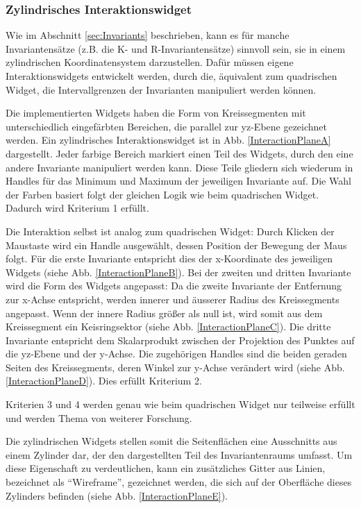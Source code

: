 \documentclass[a4paper,fontsize=12pt,toc=bib,halfparskip]{scrartcl}
\begin{document}
\subsubsection{Zylindrisches Interaktionswidget}
Wie im Abschnitt \ref{sec:Invariants} beschrieben, kann es f\"ur manche Invariantens\"atze (z.B. die K- und R-Invariantens\"atze) sinnvoll sein, sie in einem zylindrischen Koordinatensystem darzustellen. Daf\"ur m\"ussen eigene Interaktionswidgets entwickelt werden, durch die, \"aquivalent zum quadrischen Widget, die Intervallgrenzen der Invarianten manipuliert werden k\"onnen.

Die implementierten Widgets haben die Form von Kreissegmenten mit unterschiedlich eingef\"arbten Bereichen, die parallel zur yz-Ebene gezeichnet werden. Ein zylindrisches Interaktionswidget ist in Abb. \ref{InteractionPlaneA} dargestellt. Jeder farbige Bereich markiert einen Teil des Widgets, durch den eine andere Invariante manipuliert werden kann. Diese Teile gliedern sich wiederum in Handles f\"ur das Minimum und Maximum der jeweiligen Invariante auf. Die Wahl der Farben basiert folgt der gleichen Logik wie beim quadrischen Widget. Dadurch wird Kriterium 1 erf\"ullt.

Die Interaktion selbst ist analog zum quadrischen Widget: Durch Klicken der Maustaste wird ein Handle ausgew\"ahlt, dessen Position der Bewegung der Maus folgt. F\"ur die erste Invariante entspricht dies der x-Koordinate des jeweiligen Widgets (siehe Abb. \ref{InteractionPlaneB}). Bei der zweiten und dritten Invariante wird die Form des Widgets angepasst: Da die zweite Invariante der Entfernung zur x-Achse entspricht, werden innerer und \"ausserer Radius des Kreissegments angepasst. Wenn der innere Radius gr\"o{\ss}er als null ist, wird somit aus dem Kreissegment ein Keisringsektor (siehe Abb. \ref{InteractionPlaneC}). Die dritte Invariante entspricht dem Skalarprodukt zwischen der Projektion des Punktes auf die yz-Ebene und der y-Achse. Die zugeh\"origen Handles sind die beiden geraden Seiten des Kreissegments, deren Winkel zur y-Achse ver\"andert wird (siehe Abb. \ref{InteractionPlaneD}). Dies erf\"ullt Kriterium 2.

Kriterien 3 und 4 werden genau wie beim quadrischen Widget nur teilweise erf\"ullt und werden Thema von weiterer Forschung.

Die zylindrischen Widgets stellen somit die Seitenfl\"achen eine Ausschnitts aus einem Zylinder dar, der den dargestellten Teil des Invariantenraums umfasst. Um diese Eigenschaft zu verdeutlichen, kann ein zus\"atzliches Gitter aus Linien, bezeichnet als ``Wireframe'', gezeichnet werden, die sich auf der Oberfl\"ache dieses Zylinders befinden (siehe Abb. \ref{InteractionPlaneE}).
\end{document}
